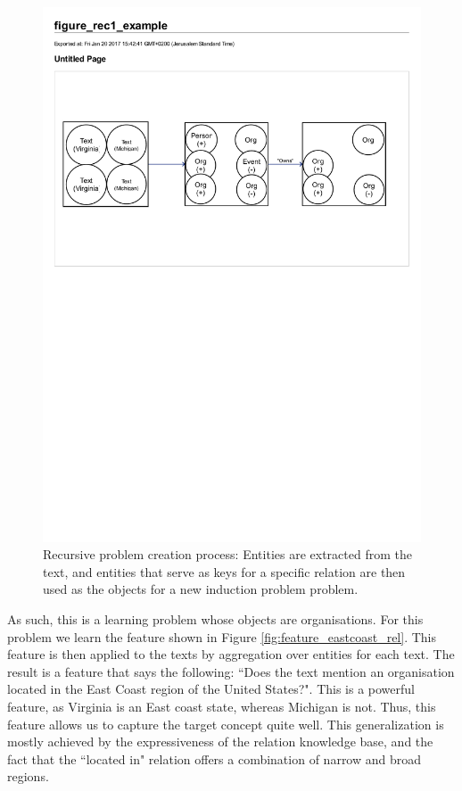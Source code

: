 \documentclass[twoside,11pt]{article}
\theoremstyle{definition}
\begin{document}
\begin{figure}[!h]
	\centering
	\includegraphics[width=\linewidth]{figure_rec1_example}
	\caption{Recursive problem creation process: Entities are extracted from the text, and entities that serve as keys for a specific relation are then used as the objects for a new induction problem problem.}
	\label{fig:figure_rec1_example}
\end{figure}

As such, this is a learning problem whose objects are organisations. For this problem we learn the feature shown in Figure \ref{fig:feature_eastcoast_rel}. This feature is then applied to the texts by aggregation over entities for each text.
The result is a feature that says the following: ``Does the text mention an organisation located in the East Coast region of the United States?".
This is a powerful feature, as Virginia is an East coast state, whereas Michigan is not. Thus, this feature allows us to capture the target concept quite well.
This generalization is mostly achieved by the expressiveness of the relation knowledge base, and the fact that the ``located in" relation offers a combination of narrow and broad regions.
\end{document}
